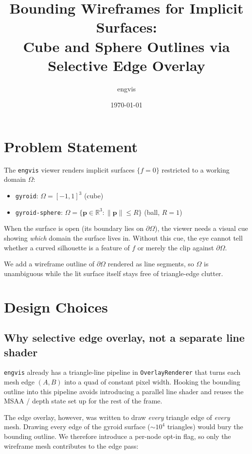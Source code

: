 \documentclass[11pt]{article}
\title{Bounding Wireframes for Implicit Surfaces:\\
       Cube and Sphere Outlines via Selective Edge Overlay}
\author{engvis}
\date{\today}
\begin{document}
\maketitle

\section{Problem Statement}

The \texttt{engvis} viewer renders implicit surfaces $\{f=0\}$
restricted to a working domain $\Omega$:
\begin{itemize}
  \item \texttt{gyroid}: $\Omega = [-1,1]^3$ (cube)
  \item \texttt{gyroid-sphere}: $\Omega = \{\mathbf{p}\in\mathbb{R}^3 :
        \|\mathbf{p}\|\le R\}$ (ball, $R=1$)
\end{itemize}

When the surface is open (its boundary lies on $\partial\Omega$), the
viewer needs a visual cue showing \emph{which} domain the surface lives
in.  Without this cue, the eye cannot tell whether a curved silhouette
is a feature of $f$ or merely the clip against $\partial\Omega$.

We add a wireframe outline of $\partial\Omega$ rendered as line
segments, so $\Omega$ is unambiguous while the lit surface itself stays
free of triangle-edge clutter.

\section{Design Choices}

\subsection{Why selective edge overlay, not a separate line shader}

\texttt{engvis} already has a triangle-line pipeline in
\texttt{OverlayRenderer} that turns each mesh edge $(A,B)$ into a quad
of constant pixel width.  Hooking the bounding outline into this
pipeline avoids introducing a parallel line shader and reuses the
MSAA / depth state set up for the rest of the frame.

The edge overlay, however, was written to draw \emph{every} triangle
edge of \emph{every} mesh.  Drawing every edge of the gyroid surface
(\(\sim10^4\) triangles) would bury the bounding outline.  We
therefore introduce a per-node opt-in flag, so only the wireframe
mesh contributes to the edge pass:
\end{document}
